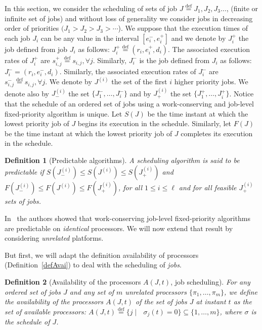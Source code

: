 \documentclass[a4paper,11pt]{article}
\newtheorem{Definition}{Definition}
\newcommand{\equals}{\stackrel{\mathrm{def}}{=}}
\begin{document}
In this section, we consider the scheduling of sets of job $J \equals J_{1}, J_{2}, J_{3}\ldots$, (finite or infinite set of jobs) and without loss of generality we consider jobs in decreasing order of priorities $(J_1 > J_2 > J_{3} > \cdots$). We suppose that the execution times of each job $J_i$ can be any value in the interval $[e_i^{-}, e_i^{+}]$ and we denote by $J^{+}_i$ the job defined from job $J_i$ as follows:
$J^{+}_i \equals (r_i,e_i^{+},d_i)$. The associated execution rates of
$J^{+}_i$ are $s_{i,j}^{+} \equals s_{i,j}, \forall j$.  Similarly,
$J^{-}_i$ is the job defined from $J_i$ as follows:
$J^{-}_i=(r_i,e_i^{-},d_i)$. Similarly, the associated execution rates
of $J^{-}_i$ are $s_{i,j}^{-} \equals s_{i,j}, \forall j$. We denote
by $J^{(i)}$ the set of the first $i$ higher priority jobs. We denote
also by $J^{(i)}_{-}$ the set $\{ J^{-}_1, \ldots, J^{-}_i \}$ and by
$J^{(i)}_{+}$ the set $\{J^{+}_1, \ldots, J^{+}_i \}$. Notice that the
schedule of an ordered set of jobs using a work-conserving and
job-level fixed-priority algorithm is unique. Let $S(J)$ be the time instant at
which the lowest priority job of $J$ begins its execution in the
schedule. Similarly, let $F(J)$ be the time instant at which the
lowest priority job of $J$ completes its execution in the schedule.

\begin{Definition}[Predictable algorithms]\label{predAlg}
  A scheduling algorithm is said to be {\em predictable} if $S(J^{(i)}_{-})
  \leq S(J^{(i)}) \leq S(J^{(i)}_{+})$ and $F(J^{(i)}_{-}) \leq
  F(J^{(i)}) \leq F(J^{(i)}_{+})$, for all $1 \leq i \leq \ell$ and for all
feasible $J^{(i)}_{+}$ sets of jobs.
\end{Definition}

In~\cite{Ha} the authors showed that work-conserving job-level fixed-priority
algorithms are predictable on \emph{identical} processors. We will now extend that result by considering \emph{unrelated} platforms.

But first, we will adapt the definition availability of processors (Definition~\ref{defAvai}) to deal with the scheduling of \emph{jobs}. 

\begin{Definition}[Availability of the processors $A(J,t)$, job scheduling]\label{defAvaiJob}
For any ordered set of jobs $J$ and any set of $m$ unrelated processors
$\{\pi_1, \ldots, \pi_m \}$, we define the
  {\em availability of the processors} $A(J,t)$ of the set of jobs $J$
  at instant $t$ as the set of available processors: $A(J,t) \equals
  \{j \mid \mbox{ } \sigma_j(t)=0 \} \subseteq \{1, \ldots, m \}$, where
  $\sigma$ is the schedule of $J$.
\end{Definition}
\end{document}
